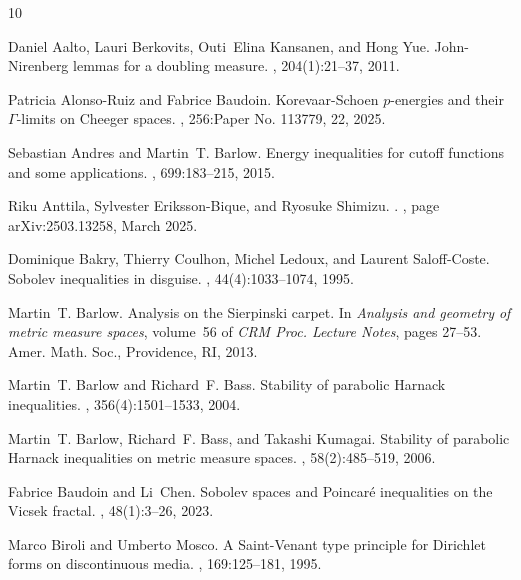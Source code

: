 \documentclass[11pt,a4paper]{article}
\numberwithin{equation}{section}
\theoremstyle{plain}
\theoremstyle{definition}
\begin{document}
\begin{thebibliography}{10}

Daniel Aalto, Lauri Berkovits, Outi~Elina Kansanen, and Hong Yue.
\newblock John-{N}irenberg lemmas for a doubling measure.
, 204(1):21--37, 2011.

Patricia Alonso-Ruiz and Fabrice Baudoin.
\newblock Korevaar-{S}choen {$p$}-energies and their {$\Gamma $}-limits on
  {C}heeger spaces.
, 256:Paper No. 113779, 22, 2025.

Sebastian Andres and Martin~T. Barlow.
\newblock Energy inequalities for cutoff functions and some applications.
, 699:183--215, 2015.

Riku {Anttila}, Sylvester {Eriksson-Bique}, and Ryosuke {Shimizu}.
.
, page arXiv:2503.13258, March 2025.

Dominique Bakry, Thierry Coulhon, Michel Ledoux, and Laurent Saloff-Coste.
\newblock Sobolev inequalities in disguise.
, 44(4):1033--1074, 1995.

Martin~T. Barlow.
\newblock Analysis on the {S}ierpinski carpet.
\newblock In {\em Analysis and geometry of metric measure spaces}, volume~56 of
  {\em CRM Proc. Lecture Notes}, pages 27--53. Amer. Math. Soc., Providence,
  RI, 2013.

Martin~T. Barlow and Richard~F. Bass.
\newblock Stability of parabolic {H}arnack inequalities.
, 356(4):1501--1533, 2004.

Martin~T. Barlow, Richard~F. Bass, and Takashi Kumagai.
\newblock Stability of parabolic {H}arnack inequalities on metric measure
  spaces.
, 58(2):485--519, 2006.

Fabrice Baudoin and Li~Chen.
\newblock Sobolev spaces and {P}oincar\'e{} inequalities on the {V}icsek
  fractal.
, 48(1):3--26, 2023.

Marco Biroli and Umberto Mosco.
\newblock A {S}aint-{V}enant type principle for {D}irichlet forms on
  discontinuous media.
, 169:125--181, 1995.


\end{thebibliography}
\end{document}
